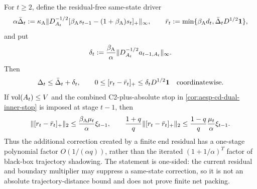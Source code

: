 \begin{lemma}
\label{lem:aesp-cd-one-sided-correction-excess}
For $t\geq2$, define the residual-free same-state driver
\begin{equation*}
 \alpha\bar\Delta_t
 :=\kappa_{\mathrm A}
 \lVert D_{A_t}^{-1/2}
 [\beta_{\mathrm A}s_{t-1}
  -(1+\beta_{\mathrm A})s_t]_+\rVert_\infty,
 \qquad
 \bar r_t:=\min\{\beta_{\mathrm A}d_t,
                  \bar\Delta_tD^{1/2}\mathbf{1}\},
\end{equation*}
and put
\begin{equation*}
 \delta_t:=\frac{\beta_{\mathrm A}}\alpha
 \lVert D_{A_t}^{-1/2}a_{t-1,A_t}\rVert_\infty.
\end{equation*}
Then
\begin{equation}
 \Delta_t\leq\bar\Delta_t+\delta_t,
 \qquad
 0\leq[r_t-\bar r_t]_+
 \leq\delta_tD^{1/2}\mathbf{1}
 \quad\text{coordinatewise}.
 \label{eq:aesp-cd-one-sided-correction-excess}
\end{equation}
If $\operatorname{vol}(A_t)\leq V$ and the combined C2-plus-absolute stop in
\cref{cor:aesp-cd-dual-inner-stop} is imposed at stage $t-1$, then
\begin{equation}
 \lVert[r_t-\bar r_t]_+\rVert_2
 \leq\frac{\beta_{\mathrm A}\mu_t}{\alpha}\xi_{t-1},
 \qquad
 \frac{1+q}{q}\lVert[r_t-\bar r_t]_+\rVert_2
 \leq\frac{1-q}{q}\frac{\mu_t}{\alpha}\xi_{t-1}.
 \label{eq:aesp-cd-one-sided-momentum-excess}
\end{equation}
Thus the additional correction created by a finite end residual has a
one-stage polynomial factor $O(1/(\alpha q))$, rather than the iterated
$(1+1/\alpha)^T$ factor of black-box trajectory shadowing.  The statement is
one-sided: the current residual and boundary multiplier may suppress a
same-state correction, so it is not an absolute trajectory-distance bound
and does not prove finite net packing.
\end{lemma}

